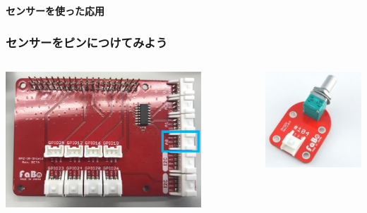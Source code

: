 \begin{frame}[plain]
    \begin{center}
        \vspace{48pt}
        {\huge\bf センサーを使った応用}
    \end{center}
\end{frame}

\begin{frame}
    \frametitle{センサーをピンにつけてみよう}
    \begin{center}
        \begin{columns}
            \begin{column}{0.48\textwidth}
                \includegraphics[width=0.8\textwidth]{images/chap05/text05-img030.png}
            \end{column}
            \begin{column}{0.48\textwidth}
                \includegraphics[width=\textwidth]{images/chap05/text05-img022.jpg} 

\end{column}
\end{columns}
\end{center}
\end{frame}

